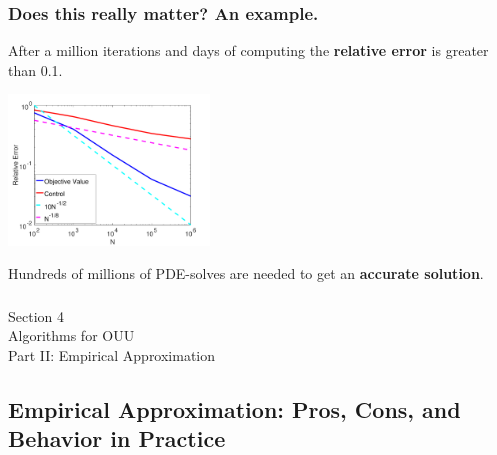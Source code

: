 \documentclass[aspectratio=169,xcolor=dvipsnames,10pt]{beamer}
\begin{document}
\begin{frame}\frametitle{Does this really matter? An example.}
\begin{exampleblock}{}\centering
After a \alert{million} iterations and \alert{days of computing} the \textbf{relative error} is \alert{greater than 0.1}.
\end{exampleblock}
\begin{center}
\includegraphics[width=0.4\textwidth,keepaspectratio]{Part I/figures/error.pdf}
\end{center}
\begin{exampleblock}{}\centering
\alert{Hundreds of millions} of \alert{PDE-solves} are needed to get an \textbf{accurate solution}.
\end{exampleblock}
\end{frame}



\begin{frame}\frametitle{}
\begin{center}\Large
Section 4\\
Algorithms for OUU\\
Part II: Empirical Approximation
\end{center}
\end{frame}


\subsection{Empirical Approximation: Pros, Cons, and Behavior in Practice} 
\end{document}
